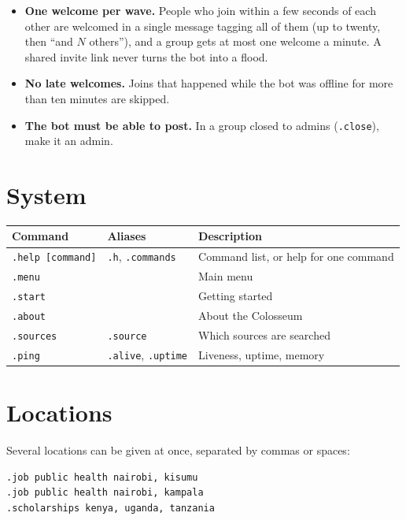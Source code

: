 \documentclass[11pt,a4paper]{report}
\begin{document}
\begin{itemize}
  \item \textbf{One welcome per wave.} People who join within a few seconds of
        each other are welcomed in a single message tagging all of them (up to
        twenty, then ``and $N$ others''), and a group gets at most one welcome
        a minute. A shared invite link never turns the bot into a flood.
  \item \textbf{No late welcomes.} Joins that happened while the bot was
        offline for more than ten minutes are skipped.
  \item \textbf{The bot must be able to post.} In a group closed to admins
        (\texttt{.close}), make it an admin.
\end{itemize}

\section{System}

\begin{center}
\begin{tabularx}{\textwidth}{@{}llX@{}}
\toprule
\textbf{Command} & \textbf{Aliases} & \textbf{Description} \\
\midrule
\texttt{.help [command]} & \texttt{.h}, \texttt{.commands} & Command list, or
help for one command \\
\texttt{.menu} & & Main menu \\
\texttt{.start} & & Getting started \\
\texttt{.about} & & About the Colosseum \\
\texttt{.sources} & \texttt{.source} & Which sources are searched \\
\texttt{.ping} & \texttt{.alive}, \texttt{.uptime} & Liveness, uptime, memory \\
\bottomrule
\end{tabularx}
\end{center}

\section{Locations}

Several locations can be given at once, separated by commas or spaces:

\begin{lstlisting}
.job public health nairobi, kisumu
.job public health nairobi, kampala
.scholarships kenya, uganda, tanzania
\end{lstlisting}
\end{document}
